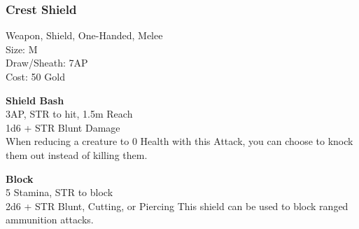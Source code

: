 \subsubsection{Crest Shield}\label{weapon:crestShield}
Weapon, Shield, One-Handed, Melee\\
Size: M\\
Draw/Sheath: 7AP\\
Cost: 50 Gold

\textbf{Shield Bash}\\
3AP, STR to hit, 1.5m Reach\\
1d6 + \texttimes STR Blunt Damage\\
When reducing a creature to 0 Health with this Attack, you can choose to knock them out instead of killing them.

\textbf{Block}\\
5 Stamina, STR to block\\
2d6 + \texttimes STR Blunt, Cutting, or Piercing
This shield can be used to block ranged ammunition attacks.\\

